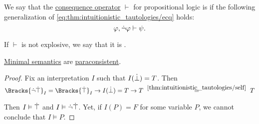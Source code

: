 \begin{definition}\label{def:paraconsistent_consequence_operator}
  We say that the \hyperref[def:consequence_operator]{consequence operator} \( \vdash \) for propositional logic is  if the following generalization of \eqref{eq:thm:intuitionistic_tautologies/ecq} holds:
  \begin{equation*}
    \varphi, \dot{\neg} \varphi \vdash \psi.
  \end{equation*}

  If \( \vdash \) is not explosive, we say that it is .
\end{definition}

\begin{proposition}\label{thm:minimal_semantics_are_paraconsistent}
  \hyperref[def:minimal_propositional_semantics]{Minimal semantics} are \hyperref[def:paraconsistent_consequence_operator]{paraconsistent}.
\end{proposition}
\begin{proof}
  Fix an interpretation \( I \) such that \( I(\dot{\bot}) = T \). Then
  \begin{equation*}
    \Bracks{\synneg \syntop}_I
    =
    \Bracks{\syntop}_I \rightarrow I(\synbot)
    =
    T \rightarrow T
    \reloset {\ref{thm:intuitionistic_tautologies/self}} =
    T
  \end{equation*}

  Then \( I \vDash \dot{\top} \) and \( I \vDash \dot{\neg} \dot{\top} \). Yet, if \( I(P) = F \) for some variable \( P \), we cannot conclude that \( I \vDash P \).
\end{proof}

